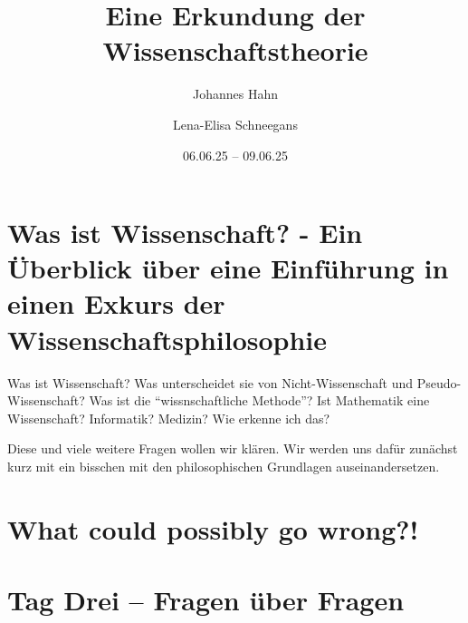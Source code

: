\documentclass[fontsize=11pt,fleqn,a4paper]{scrartcl}
\author{Johannes Hahn \and Lena-Elisa Schneegans}
\title{Eine Erkundung der Wissenschaftstheorie}
\date{06.06.25 -- 09.06.25}
\begin{document}
\maketitle

\tableofcontents
\pagebreak


\section{Was ist Wissenschaft? - Ein Überblick über eine Einführung in einen Exkurs der Wissenschaftsphilosophie}


Was ist Wissenschaft? Was unterscheidet sie von Nicht-Wissenschaft und Pseudo-Wissenschaft? Was ist die
\enquote{wissnschaftliche Methode}? Ist Mathematik eine Wissenschaft? Informatik? Medizin? Wie erkenne ich das?

Diese und viele weitere Fragen wollen wir klären. Wir werden uns dafür zunächst kurz mit ein bisschen mit den
philosophischen Grundlagen auseinandersetzen.

\pagebreak


\section{What could possibly go wrong?!}



\pagebreak


\section{Tag Drei -- Fragen über Fragen}


\pagebreak
\printbibliography
\end{document}
